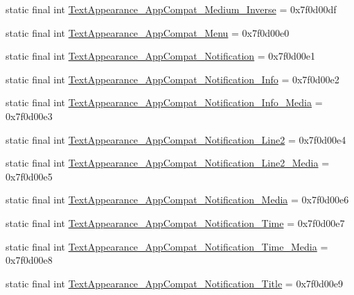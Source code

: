 \begin{DoxyCompactItemize}
\item 
static final int \mbox{\hyperlink{classandroid_1_1support_1_1design_1_1R_1_1style_afedf82a346a4efa74ea8c629e33ca220}{Text\+Appearance\+\_\+\+App\+Compat\+\_\+\+Medium\+\_\+\+Inverse}} = 0x7f0d00df
\item 
static final int \mbox{\hyperlink{classandroid_1_1support_1_1design_1_1R_1_1style_ac915ed93a55ceecfd2cab0a8274bec5c}{Text\+Appearance\+\_\+\+App\+Compat\+\_\+\+Menu}} = 0x7f0d00e0
\item 
static final int \mbox{\hyperlink{classandroid_1_1support_1_1design_1_1R_1_1style_a426b7d0cec7c41e1f68acf13305bf7dd}{Text\+Appearance\+\_\+\+App\+Compat\+\_\+\+Notification}} = 0x7f0d00e1
\item 
static final int \mbox{\hyperlink{classandroid_1_1support_1_1design_1_1R_1_1style_a668e76478ed130092655afd22d7a7712}{Text\+Appearance\+\_\+\+App\+Compat\+\_\+\+Notification\+\_\+\+Info}} = 0x7f0d00e2
\item 
static final int \mbox{\hyperlink{classandroid_1_1support_1_1design_1_1R_1_1style_a87c36a692f717f9e9397e27d2fcd26d0}{Text\+Appearance\+\_\+\+App\+Compat\+\_\+\+Notification\+\_\+\+Info\+\_\+\+Media}} = 0x7f0d00e3
\item 
static final int \mbox{\hyperlink{classandroid_1_1support_1_1design_1_1R_1_1style_afcaa3e2666713abe586956307013b148}{Text\+Appearance\+\_\+\+App\+Compat\+\_\+\+Notification\+\_\+\+Line2}} = 0x7f0d00e4
\item 
static final int \mbox{\hyperlink{classandroid_1_1support_1_1design_1_1R_1_1style_aec729e40b42605f9fec30c48073b7f03}{Text\+Appearance\+\_\+\+App\+Compat\+\_\+\+Notification\+\_\+\+Line2\+\_\+\+Media}} = 0x7f0d00e5
\item 
static final int \mbox{\hyperlink{classandroid_1_1support_1_1design_1_1R_1_1style_afbae535d1b595b38343f91262a744996}{Text\+Appearance\+\_\+\+App\+Compat\+\_\+\+Notification\+\_\+\+Media}} = 0x7f0d00e6
\item 
static final int \mbox{\hyperlink{classandroid_1_1support_1_1design_1_1R_1_1style_aaf0e340b54d921a671fc7bb53c1b47bb}{Text\+Appearance\+\_\+\+App\+Compat\+\_\+\+Notification\+\_\+\+Time}} = 0x7f0d00e7
\item 
static final int \mbox{\hyperlink{classandroid_1_1support_1_1design_1_1R_1_1style_a152da3a37324161ed0ab041d41a5bde1}{Text\+Appearance\+\_\+\+App\+Compat\+\_\+\+Notification\+\_\+\+Time\+\_\+\+Media}} = 0x7f0d00e8
\item 
static final int \mbox{\hyperlink{classandroid_1_1support_1_1design_1_1R_1_1style_a45fd73323de80651f60adee1fac94eec}{Text\+Appearance\+\_\+\+App\+Compat\+\_\+\+Notification\+\_\+\+Title}} = 0x7f0d00e9

\end{DoxyCompactItemize}
